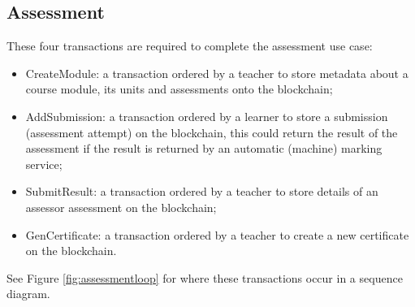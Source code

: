 \subsection{Assessment}

These four transactions are required to complete the assessment use case:
\begin{itemize}
    \setlength\itemsep{0em}        
    \item CreateModule: a transaction ordered by a teacher to store metadata about a course module, 
    its units and assessments onto the blockchain;
    \item AddSubmission: a transaction ordered by a learner to store a submission (assessment attempt) 
    on the blockchain, this could return the result of the assessment if the result is returned by 
    an automatic (machine) marking service;
    \item SubmitResult: a transaction ordered by a teacher to store details of an assessor assessment 
    on the blockchain;
    \item GenCertificate: a transaction ordered by a teacher to create a new certificate on the blockchain.
\end{itemize}

See Figure \ref{fig:assessmentloop} for where these transactions occur in a sequence diagram.

